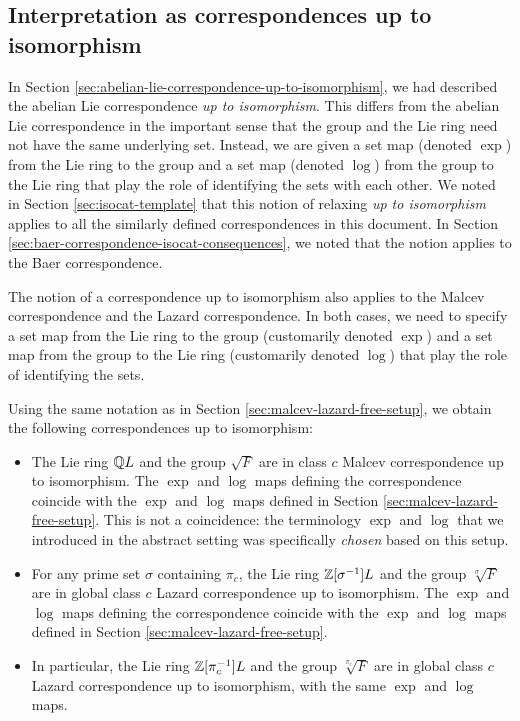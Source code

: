 \subsection{Interpretation as correspondences up to isomorphism}\label{sec:malcev-lazard-correspondence-interpretation}

In Section \ref{sec:abelian-lie-correspondence-up-to-isomorphism}, we
had described the abelian Lie correspondence {\em up to
  isomorphism}. This differs from the abelian Lie correspondence in
the important sense that the group and the Lie ring need not have the
same underlying set. Instead, we are given a set map (denoted $\exp$)
from the Lie ring to the group and a set map (denoted $\log$) from the
group to the Lie ring that play the role of identifying the sets with
each other. We noted in Section \ref{sec:isocat-template} that this
notion of relaxing {\em up to isomorphism} applies to all the
similarly defined correspondences in this document. In Section
\ref{sec:baer-correspondence-isocat-consequences}, we noted that the
notion applies to the Baer correspondence.

The notion of a correspondence up to isomorphism also applies to the
Malcev correspondence and the Lazard correspondence. In both cases, we
need to specify a set map from the Lie ring to the group (customarily
denoted $\exp$) and a set map from the group to the Lie ring
(customarily denoted $\log$) that play the role of identifying the sets.

Using the same notation as in Section
\ref{sec:malcev-lazard-free-setup}, we obtain the following
correspondences up to isomorphism:

\begin{itemize}
\item The Lie ring $\mathbb{Q} L$ and the group $\sqrt{F}$ are in class $c$
  Malcev correspondence up to isomorphism. The $\exp$ and $\log$ maps
  defining the correspondence coincide with the $\exp$ and $\log$ maps
  defined in Section \ref{sec:malcev-lazard-free-setup}. This is not a
  coincidence: the terminology $\exp$ and $\log$ that we introduced in
  the abstract setting was specifically {\em chosen} based on this
  setup.
\item For any prime set $\sigma$ containing $\pi_c$, the Lie ring
  $\mathbb{Z}[\sigma^{-1}]L$ and the group $\sqrt[\sigma]{F}$ are in global
  class $c$ Lazard correspondence up to isomorphism. The $\exp$ and
  $\log$ maps defining the correspondence coincide with the $\exp$ and
  $\log$ maps defined in Section \ref{sec:malcev-lazard-free-setup}.
\item In particular, the Lie ring $\mathbb{Z}[\pi_c^{-1}]L$ and the group
  $\sqrt[\pi_c]{F}$ are in global class $c$ Lazard correspondence up
  to isomorphism, with the same $\exp$ and $\log$ maps.
\end{itemize}

